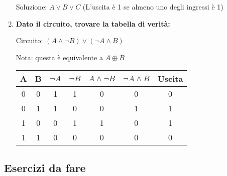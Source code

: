 \documentclass[12pt,a4paper]{article}
\begin{document}
\begin{enumerate}
    Soluzione: $A \lor B \lor C$ (L'uscita è 1 se almeno uno degli ingressi è 1)

    \item \textbf{Dato il circuito, trovare la tabella di verità:}
    
    Circuito: $(A \land \lnot B) \lor (\lnot A \land B)$
    
    Nota: questa è equivalente a $A \oplus B$
    
    \begin{center}
    \begin{tabular}{|c|c||c|c|c|c|c|}
    \hline
    A & B & $\lnot A$ & $\lnot B$ & $A \land \lnot B$ & $\lnot A \land B$ & Uscita \\
    \hline
    0 & 0 & 1 & 1 & 0 & 0 & 0 \\
    0 & 1 & 1 & 0 & 0 & 1 & 1 \\
    1 & 0 & 0 & 1 & 1 & 0 & 1 \\
    1 & 1 & 0 & 0 & 0 & 0 & 0 \\
    \hline
    \end{tabular}
    \end{center}

\end{enumerate}

\subsection{Esercizi da fare}
\end{document}
